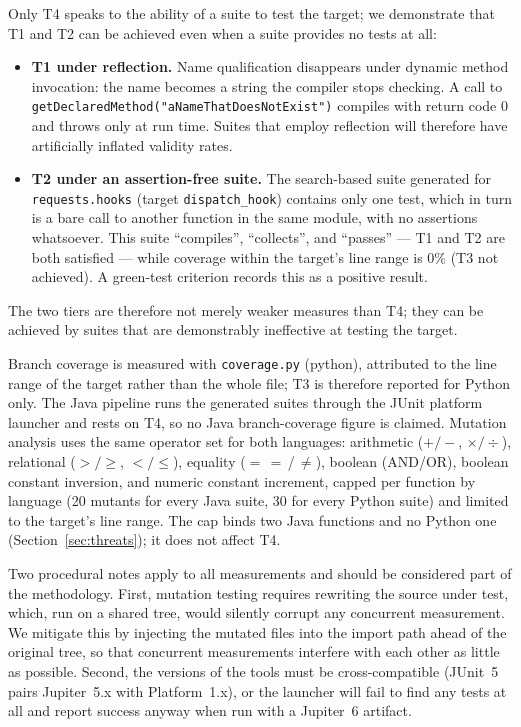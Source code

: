 Only T4 speaks to the ability of a suite to test the target; we demonstrate that T1 and T2 can
be achieved even when a suite provides no tests at all:

\begin{itemize}
  \item \textbf{T1 under reflection.} Name qualification disappears under dynamic method
    invocation: the name becomes a string the compiler stops checking. A call to
    \texttt{getDeclaredMethod("aNameThatDoesNotExist")} compiles with return code 0 and throws
    only at run time. Suites that employ reflection will therefore have artificially inflated
    validity rates.
  \item \textbf{T2 under an assertion-free suite.} The search-based suite generated for
    \texttt{requests.hooks} (target \texttt{dispatch\_hook}) contains only one test, which in
    turn is a bare call to another function in the same module, with no assertions whatsoever.
    This suite ``compiles'', ``collects'', and ``passes'' --- T1 and T2 are both satisfied ---
    while coverage within the target's line range is $0\%$ (T3 not achieved). A green-test
    criterion records this as a positive result.
\end{itemize}

The two tiers are therefore not merely weaker measures than T4; they can be achieved by suites
that are demonstrably ineffective at testing the target.

Branch coverage is measured with \texttt{coverage.py} (python), attributed to the line range
of the target rather than the whole file; T3 is therefore reported for Python only. The Java
pipeline runs the generated suites through the JUnit platform launcher and rests on T4, so no
Java branch-coverage figure is claimed. Mutation analysis uses the same operator set for both
languages: arithmetic ($+/-$, $\times/\div$), relational ($>/\ge$, $</\le$), equality
($=$\,$=$\,/\,$\neq$), boolean (AND/OR), boolean constant inversion, and numeric constant
increment, capped per function by language (20 mutants for every Java suite, 30 for every
Python suite) and limited to the target's line range. The cap binds two Java functions and no
Python one (Section~\ref{sec:threats}); it does not affect T4.

Two procedural notes apply to all measurements and should be considered part of the
methodology. First, mutation testing requires rewriting the source under test, which, run on a
shared tree, would silently corrupt any concurrent measurement. We mitigate this by injecting
the mutated files into the import path ahead of the original tree, so that concurrent
measurements interfere with each other as little as possible. Second, the versions of the
tools must be cross-compatible (JUnit~5 pairs Jupiter~5.x with Platform~1.x), or the launcher
will fail to find any tests at all and report success anyway when run with a Jupiter~6
artifact.

